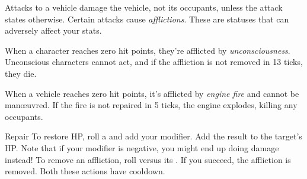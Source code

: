 
Attacks to a vehicle damage the vehicle, not its occupants, unless the attack states otherwise. Certain attacks cause \emph{afflictions}. These are statuses that can adversely affect your stats.

When a character reaches zero hit points, they're afflicted by \emph{unconsciousness}. Unconscious characters cannot act, and if the affliction is not removed in 13 ticks, they die.

When a vehicle reaches zero hit points, it's afflicted by \emph{engine fire} and cannot be man\oe{}uvred. If the fire is not repaired in 5 ticks, the engine explodes, killing any occupants.

\begin{abstractsection}{Repair}
To restore HP, roll a  and add your  modifier. Add the result to the target's HP. Note that if your modifier is negative, you might end up doing damage instead! To remove an affliction, roll  versus its . If you succeed, the affliction is removed. Both these actions have  cooldown.
\end{abstractsection}
